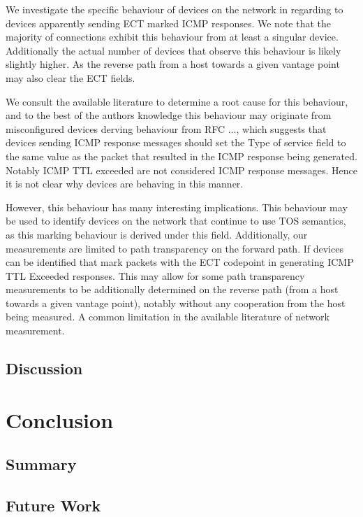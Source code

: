 \documentclass{l4proj}
\begin{document}
We investigate the specific behaviour of devices on the network in regarding to devices apparently sending ECT marked ICMP responses. We note that the majority of connections exhibit this behaviour from at least a singular device. Additionally the actual number of devices that observe this behaviour is likely slightly higher. As the reverse path from a host towards a given vantage point may also clear the ECT fields.

We consult the available literature to determine a root cause for this behaviour, and to the best of the authors knowledge this behaviour may originate from misconfigured devices derving behaviour from RFC ..., which suggests that devices sending ICMP response messages should set the Type of service field to the same value as the packet that resulted in the ICMP response being generated. Notably ICMP TTL exceeded are not considered ICMP response messages. Hence it is not clear why devices are behaving in this manner.

However, this behaviour has many interesting implications. This behaviour may be used to identify devices on the network that continue to use TOS semantics, as this marking behaviour is derived under this field. Additionally, our measurements are limited to path transparency on the forward path. If devices can be identified that mark packets with the ECT codepoint in generating ICMP TTL Exceeded responses. This may allow for some path transparency measurements to be additionally determined on the reverse path (from a host towards a given vantage point), notably without any cooperation from the host being measured. A common limitation in the available literature of network measurement.

\section{Discussion}

\chapter{Conclusion}    
\section{Summary}


\section{Future Work}
\end{document}
